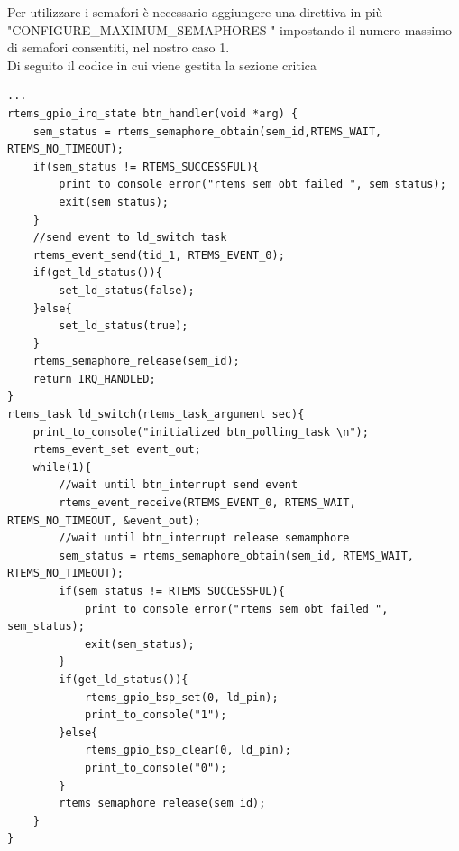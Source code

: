 \documentclass[12pt, a4paper, titlepage, oneside]{book}
\begin{document}
\begin{flushleft}
Per utilizzare i semafori è necessario aggiungere una direttiva in più "CONFIGURE\_MAXIMUM\_SEMAPHORES " impostando il numero massimo di semafori consentiti, nel nostro caso 1.\\
Di seguito il codice in cui viene gestita la sezione critica
\begin{lstlisting}[style = CStyle]
...
rtems_gpio_irq_state btn_handler(void *arg) {
	sem_status = rtems_semaphore_obtain(sem_id,RTEMS_WAIT, RTEMS_NO_TIMEOUT);
	if(sem_status != RTEMS_SUCCESSFUL){
		print_to_console_error("rtems_sem_obt failed ", sem_status);
		exit(sem_status);
	}
	//send event to ld_switch task
	rtems_event_send(tid_1, RTEMS_EVENT_0);
	if(get_ld_status()){
		set_ld_status(false);
	}else{
		set_ld_status(true);
	}
	rtems_semaphore_release(sem_id);
	return IRQ_HANDLED;
}
rtems_task ld_switch(rtems_task_argument sec){
	print_to_console("initialized btn_polling_task \n");
	rtems_event_set event_out;
	while(1){
		//wait until btn_interrupt send event
		rtems_event_receive(RTEMS_EVENT_0, RTEMS_WAIT, RTEMS_NO_TIMEOUT, &event_out);
		//wait until btn_interrupt release semamphore
		sem_status = rtems_semaphore_obtain(sem_id, RTEMS_WAIT, RTEMS_NO_TIMEOUT);
		if(sem_status != RTEMS_SUCCESSFUL){
			print_to_console_error("rtems_sem_obt failed ", sem_status);
			exit(sem_status);
		}
		if(get_ld_status()){
			rtems_gpio_bsp_set(0, ld_pin);
			print_to_console("1");
		}else{
			rtems_gpio_bsp_clear(0, ld_pin);
			print_to_console("0");
		}
		rtems_semaphore_release(sem_id);
	}
}
\end{lstlisting}



\end{flushleft}
\end{document}
